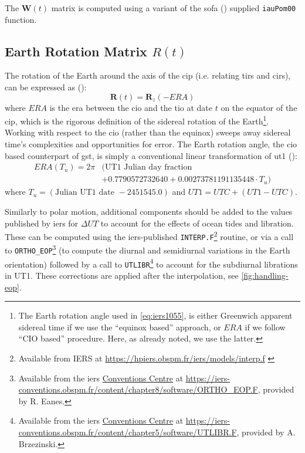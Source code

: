 The $\bm{W}(t)$ matrix is computed using a variant of the \gls{sofa} (\cite{SOFA20210125}) 
supplied \texttt{iauPom00} function.

\subsection{Earth Rotation Matrix $R(t)$}
\label{ssec:earth-rotation-matrix}
The rotation of the Earth around the axis of the \gls{cip} (i.e. relating 
\gls{tirs} and \gls{cirs}), can be expressed as (\cite{iers2010}):
\begin{equation}
  \bm{R}(t) = \bm{R}_z (-ERA)
  \label{eq:iers1055}
\end{equation}
where $ERA$ is the \gls{era} between the \gls{cio} and the \gls{tio} 
at date $t$ on the equator of the \gls{cip}, which is the rigorous definition 
of the sidereal rotation of the Earth\footnote{The Earth rotation angle used in 
\ref{eq:iers1055}, is either Greenwich apparent sidereal time if we use the 
``equinox based'' approach, or $ERA$ if we follow ``CIO based'' procedure. Here, 
as already noted, we use the latter.}. Working with respect to the \gls{cio} 
(rather than the equinox) sweeps away sidereal time's complexities and opportunities 
for error. The Earth rotation angle, the \gls{cio} based counterpart of \gls{gst},
is simply a conventional linear transformation of \gls{ut1} (\cite{sofa_18141_eacb}):
\begin{equation}
  \label{eq:iers10515}
  \begin{split}
    ERA(T_u) = 2 \pi & ( \text{UT1 Julian day fraction } \\
                     & + 0.7790572732640 + 0.00273781191135448 \cdot T_u )
    \end{split}
\end{equation}
where $T_u = \left( \text{Julian UT1 date } - 2451545.0 \right)$ and 
$UT1=UTC+(UT1-UTC)$. 

Similarly to polar motion, additional components should 
be added to the values published by \gls{iers} for $\Delta UT$ to account for 
the effects of ocean tides and libration. These can be computed using the 
\gls{iers}-published \texttt{INTERP.F}\footnote{Available from IERS at \url{https://hpiers.obspm.fr/iers/models/interp.f} \label{fn:interp-f}} 
routine, or via a call to \texttt{ORTHO\_EOP}\footnote{Available from the \gls{iers} \href{https://iers-conventions.obspm.fr/}{Conventions Centre} at \url{https://iers-conventions.obspm.fr/content/chapter8/software/ORTHO_EOP.F}, provided by R. Eanes.} 
(to compute the diurnal and semidiurnal variations in the Earth orientation) 
followed by a call to \texttt{UTLIBR}\footnote{Available from the \gls{iers} \href{https://iers-conventions.obspm.fr/}{Conventions Centre} at \url{https://iers-conventions.obspm.fr/content/chapter5/software/UTLIBR.F}, provided by A. Brzezinski.\label{fn:utlibr-f}} 
to account for the subdiurnal librations in UT1. These corrections are applied 
after the interpolation, see \ref{fig:handling-eop}.

